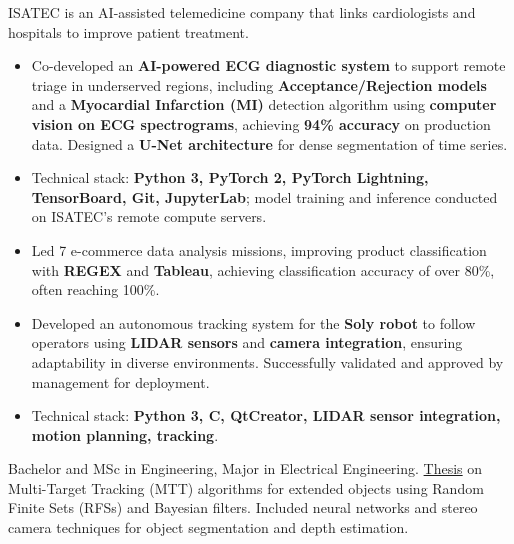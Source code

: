 \documentclass[9pt,a4paper,ragged2e]{altacv}
\begin{document}

ISATEC is an AI-assisted telemedicine company that links cardiologists and hospitals to improve patient treatment.
\begin{itemize}
\item Co-developed an \textbf{AI-powered ECG diagnostic system} to support remote triage in underserved regions, including \textbf{Acceptance/Rejection models} and a \textbf{Myocardial Infarction (MI)} detection algorithm using \textbf{computer vision on ECG spectrograms}, achieving \textbf{94\% accuracy} on production data. Designed a \textbf{U-Net architecture} for dense segmentation of time series.

\item Technical stack: \textbf{Python 3, PyTorch 2, PyTorch Lightning, TensorBoard, Git, JupyterLab}; model training and inference conducted on ISATEC's remote compute servers.
\end{itemize}

\begin{itemize}
    \item Led 7 e-commerce data analysis missions, improving product classification with \textbf{REGEX} and \textbf{Tableau}, achieving classification accuracy of over 80\%, often reaching 100\%.
\end{itemize}


\begin{itemize}
    \item Developed an autonomous tracking system for the \textbf{Soly robot} to follow operators using \textbf{LIDAR sensors} and \textbf{camera integration}, ensuring adaptability in diverse environments. Successfully validated and approved by management for deployment.
    \item Technical stack: \textbf{Python 3, C, QtCreator, LIDAR sensor integration, motion planning, tracking}.
\end{itemize}


Bachelor and MSc in Engineering, Major in Electrical Engineering.
\href{https://repositorio.uchile.cl/handle/2250/202865}{Thesis} on Multi-Target Tracking (MTT) algorithms for extended objects using Random Finite Sets (RFSs) and Bayesian filters. Included neural networks and stereo camera techniques for object segmentation and depth estimation.
\end{document}
